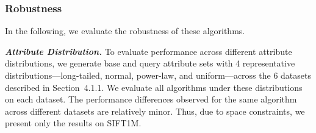 \documentclass[sigconf, nonacm]{acmart}
\begin{document}
	
	
	
	
	
	
	
	
	\subsubsection{Robustness}In the following, we evaluate the robustness of these algorithms.
	
	\textit{\textbf{Attribute Distribution.}} To evaluate performance across different attribute distributions, we generate base and query attribute sets with 4 representative distributions—long-tailed, normal, power-law, and uniform—across the 6 datasets described in Section~4.1.1. We evaluate all algorithms under these distributions on each dataset. The performance differences observed for the same algorithm across different datasets are relatively minor. Thus, due to space constraints, we present only the results on SIFT1M.
	
\end{document}
